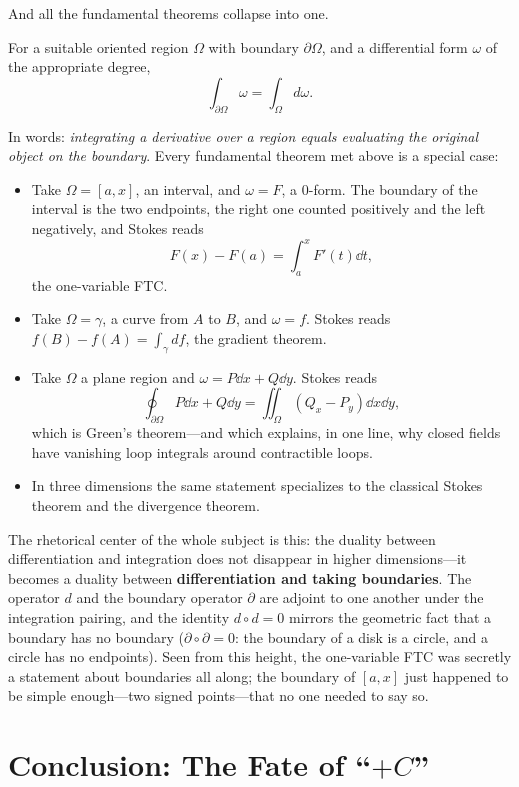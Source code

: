 \documentclass{essay}
\begin{document}
And all the fundamental theorems collapse into one.

\begin{theorem}
For a suitable oriented region $\Omega$ with boundary $\partial\Omega$, and a differential form $\omega$ of the appropriate degree,
\[
\int_{\partial\Omega} \omega = \int_{\Omega} d\omega.
\]
\end{theorem}

In words: \emph{integrating a derivative over a region equals evaluating the original object on the boundary}. Every fundamental theorem met above is a special case:
\begin{itemize}[itemsep=2pt]
\item Take $\Omega = [a,x]$, an interval, and $\omega = F$, a 0-form. The boundary of the interval is the two endpoints, the right one counted positively and the left negatively, and Stokes reads
\[
F(x) - F(a) = \int_a^x F'(t)\dd t,
\]
the one-variable FTC.
\item Take $\Omega = \gamma$, a curve from $A$ to $B$, and $\omega = f$. Stokes reads $f(B) - f(A) = \int_\gamma df$, the gradient theorem.
\item Take $\Omega$ a plane region and $\omega = P\dd x + Q\dd y$. Stokes reads
\[
\oint_{\partial\Omega} P\dd x + Q\dd y = \iint_\Omega (Q_x - P_y)\dd x \dd y,
\]
which is Green's theorem---and which explains, in one line, why closed fields have vanishing loop integrals around contractible loops.
\item In three dimensions the same statement specializes to the classical Stokes theorem and the divergence theorem.
\end{itemize}

The rhetorical center of the whole subject is this: the duality between differentiation and integration does not disappear in higher dimensions---it becomes a duality between \textbf{differentiation and taking boundaries}. The operator $d$ and the boundary operator $\partial$ are adjoint to one another under the integration pairing, and the identity $d \circ d = 0$ mirrors the geometric fact that a boundary has no boundary ($\partial \circ \partial = 0$: the boundary of a disk is a circle, and a circle has no endpoints). Seen from this height, the one-variable FTC was secretly a statement about boundaries all along; the boundary of $[a,x]$ just happened to be simple enough---two signed points---that no one needed to say so.

\section{Conclusion: The Fate of ``$+C$''}
\end{document}
